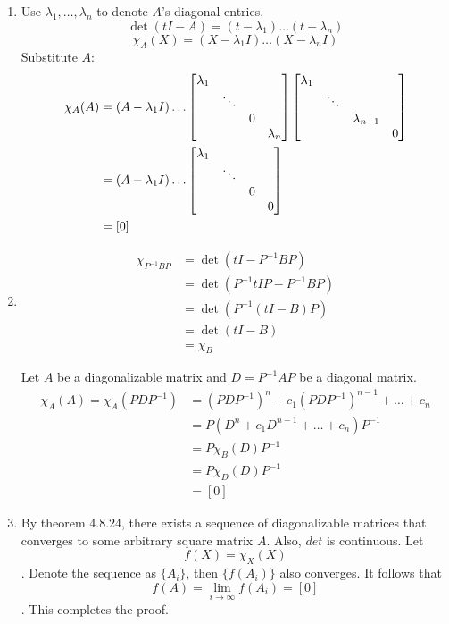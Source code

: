 \documentclass{homework}
\begin{document}
\begin{problem}{7}
\begin{enumerate}
\item
Use $\lambda_1, \hdots, \lambda_n$ to denote $A$'s diagonal entries.
$$\det(tI - A) = (t-\lambda_1) \hdots (t-\lambda_n)$$
$$\chi_A(X) = (X-\lambda_1 I) \hdots (X-\lambda_n I)$$
Substitute $A$:
\begin{align*}
\chi_A(A) &= (A-\lambda_1 I) \hdots
\begin{bmatrix}\lambda_1\\&\ddots\\&&0\\&&&\lambda_n\end{bmatrix}
\begin{bmatrix}\lambda_1\\&\ddots\\&&\lambda_{n-1}\\&&&0\end{bmatrix} \\
&= (A-\lambda_1 I) \hdots
\begin{bmatrix}\lambda_1\\&\ddots\\&&0\\&&&0\end{bmatrix} \\
&= [0]
\end{align*}

\item
\begin{align*}
\chi_{P^{-1}BP} &=
\det(tI - P^{-1}BP) \\ &=
\det(P^{-1}tIP - P^{-1}BP) \\ &=
\det(P^{-1}(tI - B)P) \\ &=
\det(tI - B) \\
&= \chi_B
\end{align*}

Let $A$ be a diagonalizable matrix and $D = P^{-1}AP$ be a diagonal matrix.
\begin{align*}
\chi_A(A) = \chi_A(PDP^{-1}) &=
(PDP^{-1})^n + c_1(PDP^{-1})^{n-1} + \hdots + c_n \\ &=
P(D^n + c_1D^{n-1} + \hdots + c_n)P^{-1} \\ &=
P\chi_B(D)P^{-1} \\ &=
P\chi_D(D)P^{-1} \\ &= [0]
\end{align*}

\item
By theorem 4.8.24, there exists a sequence of diagonalizable matrices that
converges to some arbitrary square matrix $A$. Also, $det$ is continuous. Let
$$f(X) = \chi_X(X)$$
. Denote the sequence as $\{A_i\}$, then $\{f(A_i)\}$ also converges. It
follows that
$$f(A) = \lim_{i \to \infty} f(A_i) = [0]$$
. This completes the proof. \QED
\end{enumerate}
\end{problem}
\end{document}
